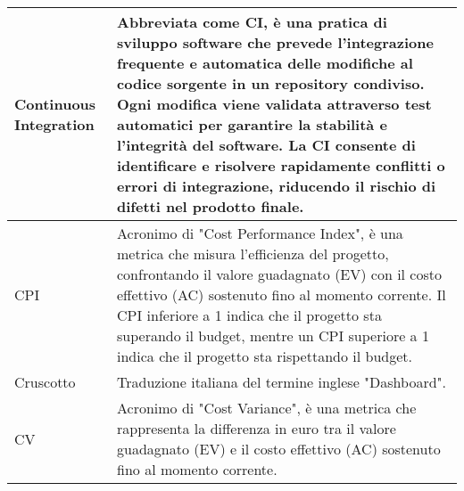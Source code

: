 \documentclass[10pt]{article}
\begin{document}
\begin{longtable}{|>{\centering\arraybackslash}m{2.5cm}|>{\arraybackslash}m{12.5cm}|}
\hline
Continuous Integration & Abbreviata come CI, è una pratica di sviluppo software che prevede l'integrazione frequente e automatica delle modifiche al codice sorgente in un repository condiviso. Ogni modifica viene validata attraverso test automatici per garantire la stabilità e l'integrità del software. La CI consente di identificare e risolvere rapidamente conflitti o errori di integrazione, riducendo il rischio di difetti nel prodotto finale.\\
\hline
CPI & Acronimo di "Cost Performance Index", è una metrica che misura l'efficienza del progetto, confrontando il valore guadagnato (EV) con il costo effettivo (AC) sostenuto fino al momento corrente. Il CPI inferiore a 1 indica che il progetto sta superando il budget, mentre un CPI superiore a 1 indica che il progetto sta rispettando il budget.\\
\hline
Cruscotto & Traduzione italiana del termine inglese "Dashboard".\\
\hline
CV & Acronimo di "Cost Variance", è una metrica che rappresenta la differenza in euro tra il valore guadagnato (EV) e il costo effettivo (AC) sostenuto fino al momento corrente.\\
\hline
\end{longtable}
\end{document}
